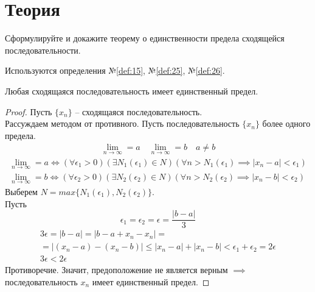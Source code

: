 \section{Теория}



\begin{question}
    Сформулируйте и докажите теорему о единственности предела сходящейся последовательности.
\end{question}
\begin{used}
    Используются определения №\ref{def:15}, №\ref{def:25}, №\ref{def:26}.
\end{used}
\begin{theorem}
    Любая сходящаяся последовательность имеет единственный предел.
\end{theorem}
\begin{proof}
    Пусть $\{x_{n}\} $ -- сходящаяся последовательность. \\
    Рассуждаем методом от противного. Пусть последовательность $\{x_{n}\} $ более одного предела.
    \begin{gather*}
        \lim_{n \to \infty} = a \quad
        \lim_{n \to \infty} = b \quad 
        a \neq b
    \end{gather*}
    \begin{gather}
        \lim_{n \to \infty} = a \iff (\forall \epsilon_1 > 0)(\exists N_1(\epsilon_1) \in N)(\forall n > N_1(\epsilon_1) \implies |x_{n} - a| < \epsilon_1) \\
        \lim_{n \to \infty} = b \iff (\forall \epsilon_2 > 0)(\exists N_2(\epsilon_2) \in N)(\forall n > N_2(\epsilon_2) \implies |x_{n} - b| < \epsilon_2)  
    \end{gather} 
    Выберем $N=max \{N_1\left( \epsilon_1 \right) , N_2\left( \epsilon_2 \right) \}$. \\
    Пусть \[
        \epsilon_1 = \epsilon_2 = \epsilon = \frac{|b - a|}{3}
    \]
    \begin{gather*}
        3 \epsilon = |b - a| = |b - a + x_{n} - x_{n}| = \\
        = |(x_{n} - a) - (x_{n} - b)| \le |x_{n} - a| + |x_{n} - b| < \epsilon_1 + \epsilon_2 = 2 \epsilon \\
        3 \epsilon < 2 \epsilon
    \end{gather*}
    Противоречие. Значит, предоположение не является верным $\implies$ последовательность $x_{n}$ имеет единственный предел.
\end{proof}
\pagebreak


